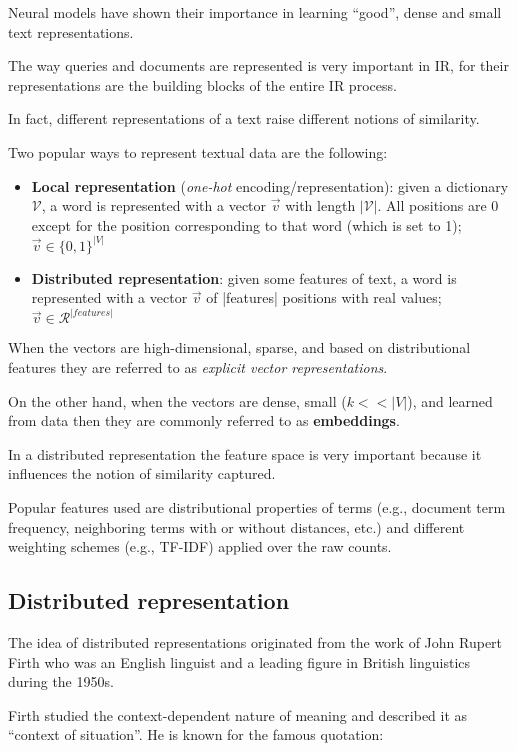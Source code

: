Neural models have shown their importance in learning ``good'', dense and small text representations.

The way queries and documents are represented is very important in IR, for their representations are the building blocks of the entire IR process.

In fact, different representations of a text raise different notions of similarity.

Two popular ways to represent textual data are the following:

\begin{itemize}
 \item \textbf{Local representation} (\textit{one-hot} encoding/representation): given a dictionary $\mathcal{V}$, a word is represented with a vector $\vec{v}$ with length $|\mathcal{V}|$.
All positions are 0 except for the position corresponding to that word (which is
set to 1); $\vec{v} \in \{ 0, 1\}^{|V|}$
 \item \textbf{Distributed representation}: given some features of text, a word is represented with a vector $\vec{v}$ of |features| positions with real values; $\vec{v} \in \mathcal{R}^{|features|}$
\end{itemize}

When the vectors are high-dimensional, sparse, and based on distributional features they are referred to as \textit{explicit vector representations}.

On the other hand, when the vectors are dense, small ($k<<|V|$), and learned from data then they are commonly referred to as \textbf{embeddings}.

In a distributed representation the feature space is very important because it influences the notion of similarity captured.

Popular features used are distributional properties of terms (e.g., document term frequency, neighboring terms with or without distances, etc.) and different weighting schemes (e.g., TF-IDF) applied over the raw counts.

\subsection{Distributed representation}

The idea of distributed representations originated from the work of John Rupert Firth who was an English linguist and a leading figure in British linguistics during the 1950s.

Firth studied the context-dependent nature of meaning and described it as ``context of situation''. He is known for the famous quotation:

